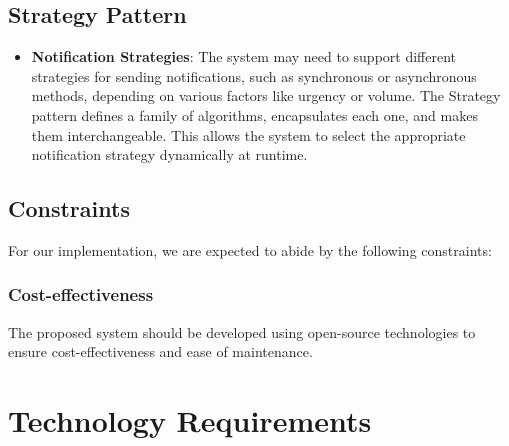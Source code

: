 \documentclass[a4paper,12pt]{article}
\begin{document}
\subsection*{Strategy Pattern}
\begin{itemize}[label=--]
    \item \textbf{Notification Strategies}: The system may need to support different strategies for sending 
    notifications, such as synchronous or asynchronous methods, depending on various factors like urgency or 
    volume. The Strategy pattern defines a family of algorithms, encapsulates each one, and makes them interchangeable. 
    This allows the system to select the appropriate notification strategy dynamically at runtime.
\end{itemize}


\subsection{Constraints}
\label{subsec:constraints}
For our implementation, we are expected to abide by the following constraints:
\subsubsection{Cost-effectiveness}
The proposed system should be developed using open-source technologies to ensure cost-effectiveness and ease of maintenance.

\section{Technology Requirements}
\label{sec:technology-requirements}
\end{document}
